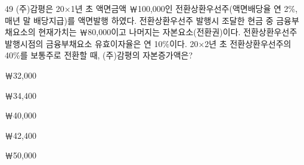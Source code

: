 \begin{question}{49}
(주)감평은 20×1년 초 액면금액 ￦100,000인 전환상환우선주(액면배당율 연 2\%, 매년 말 배당지급)를 액면발행 하였다. 전환상환우선주 발행시 조달한 현금 중 금융부채요소의 현재가치는 ￦80,000이고 나머지는 자본요소(전환권)이다. 전환상환우선주 발행시점의 금융부채요소 유효이자율은 연 10\%이다. 20×2년 초 전환상환우선주의 40\%를 보통주로 전환할 때, (주)감평의 자본증가액은?
\begin{choices}
  \item ￦32,000
  \item ￦34,400
  \item ￦40,000
  \item ￦42,400
  \item ￦50,000
\end{choices}
\end{question}
